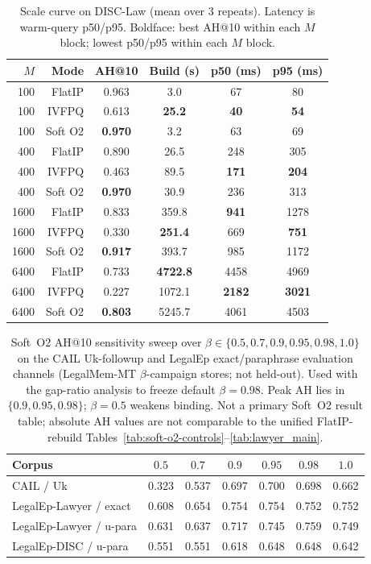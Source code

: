 \documentclass[preprint,12pt,authoryear]{elsarticle}
\newcommand{\compacttab}{\setlength{\tabcolsep}{4.5pt}\renewcommand{\arraystretch}{1.05}}
\begin{document}
\begin{table}[H]
\centering
\caption{Scale curve on DISC-Law (mean over 3 repeats). Latency is warm-query p50/p95. Boldface: best AH@10 within each $M$ block; lowest p50/p95 within each $M$ block.}
\label{tab:scale}
\compacttab\footnotesize
\begin{tabular}{@{}rrcccc@{}}
\toprule
\textbf{$M$} & \textbf{Mode} & \textbf{AH@10} & \textbf{Build (s)} & \textbf{p50 (ms)} & \textbf{p95 (ms)} \\
\midrule
100 & FlatIP & 0.963 & 3.0 & 67 & 80 \\
100 & IVFPQ & 0.613 & \textbf{25.2} & \textbf{40} & \textbf{54} \\
100 & Soft O2 & \textbf{0.970} & 3.2 & 63 & 69 \\
400 & FlatIP & 0.890 & 26.5 & 248 & 305 \\
400 & IVFPQ & 0.463 & 89.5 & \textbf{171} & \textbf{204} \\
400 & Soft O2 & \textbf{0.970} & 30.9 & 236 & 313 \\
1600 & FlatIP & 0.833 & 359.8 & \textbf{941} & 1278 \\
1600 & IVFPQ & 0.330 & \textbf{251.4} & 669 & \textbf{751} \\
1600 & Soft O2 & \textbf{0.917} & 393.7 & 985 & 1172 \\
6400 & FlatIP & 0.733 & \textbf{4722.8} & 4458 & 4969 \\
6400 & IVFPQ & 0.227 & 1072.1 & \textbf{2182} & \textbf{3021} \\
6400 & Soft O2 & \textbf{0.803} & 5245.7 & 4061 & 4503 \\
\bottomrule
\end{tabular}
\end{table}

\begin{table}[H]
\centering
\caption{Soft~O2 AH@10 sensitivity sweep over $\beta\in\{0.5,0.7,0.9,0.95,0.98,1.0\}$ on the CAIL Uk-followup and LegalEp exact/paraphrase evaluation channels (LegalMem-MT $\beta$-campaign stores; not held-out). Used with the gap-ratio analysis to freeze default $\beta{=}0.98$. Peak AH lies in $\{0.9,0.95,0.98\}$; $\beta{=}0.5$ weakens binding. Not a primary Soft~O2 result table; absolute AH values are not comparable to the unified FlatIP-rebuild Tables~\ref{tab:soft-o2-controls}--\ref{tab:lawyer_main}.}
\label{tab:beta}
\compacttab\footnotesize
\begin{tabular}{@{}lcccccc@{}}
\toprule
\textbf{Corpus} & $0.5$ & $0.7$ & $0.9$ & $0.95$ & $0.98$ & $1.0$ \\
\midrule
CAIL / Uk & 0.323 & 0.537 & 0.697 & 0.700 & 0.698 & 0.662 \\
LegalEp-Lawyer / exact & 0.608 & 0.654 & 0.754 & 0.754 & 0.752 & 0.752 \\
LegalEp-Lawyer / u-para & 0.631 & 0.637 & 0.717 & 0.745 & 0.759 & 0.749 \\
LegalEp-DISC / u-para & 0.551 & 0.551 & 0.618 & 0.648 & 0.648 & 0.642 \\
\bottomrule
\end{tabular}
\end{table}
\end{document}
